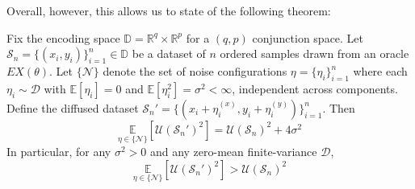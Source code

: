Overall, however, this allows us to state of the following theorem: 


\begin{theorem}
    Fix the encoding space $\mathbb{D} = \mathbb{R}^{q} \times \mathbb{R}^{p}$ 
    for a $(q,p)$ conjunction space. Let $\mathcal{S}_{n} = 
    \{(x_i, y_i)\}_{i=1}^{n} \in \mathbb{D}$ be a dataset of $n$ ordered 
    samples drawn from an oracle $EX(\theta)$. Let $\{\mathcal{N}\}$ denote 
    the set of noise configurations $\eta = \{\eta_i\}_{i=1}^{n}$ where each 
    $\eta_i \sim \mathcal{D}$ with $\mathbb{E}[\eta_i] = 0$ and 
    $\mathbb{E}[\eta_i^2] = \sigma^2 < \infty$, independent across 
    components. Define the diffused dataset 
    $\mathcal{S}_{n}' = \{(x_i + \eta_i^{(x)}, y_i + \eta_i^{(y)})\}_{i=1}^{n}$. 
    Then
    \begin{equation}
        \underset{\eta \in \{\mathcal{N}\}}{\mathbb{E}}
        \left[\mathcal{U}(\mathcal{S}_{n}')^{2}\right] 
        = \mathcal{U}(\mathcal{S}_{n})^{2} + 4\sigma^{2}
    \end{equation}
    In particular, for any $\sigma^2 > 0$ and any zero-mean 
    finite-variance $\mathcal{D}$,
    \begin{equation}
        \underset{\eta \in \{\mathcal{N}\}}{\mathbb{E}}
        \left[\mathcal{U}(\mathcal{S}_{n}')^{2}\right] 
        > \mathcal{U}(\mathcal{S}_{n})^{2}
    \end{equation}
\end{theorem}

